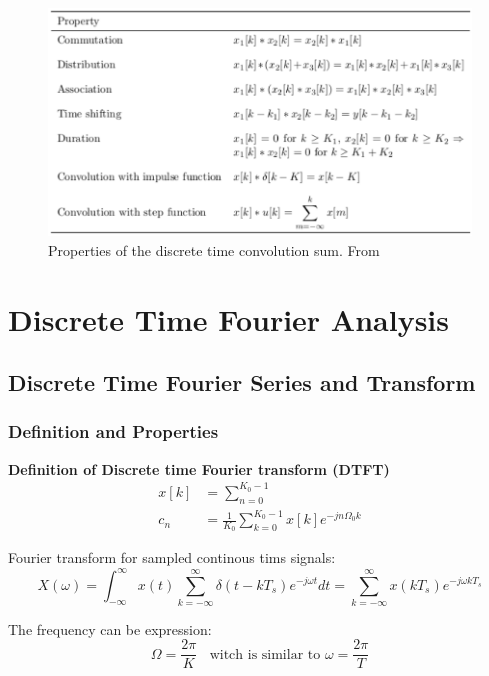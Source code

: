 \begin{figure}[H]
    \centering
    \includegraphics[width=12cm]{image/properties_of_the_discreate_time_convolution_sum.pdf}
    \caption{Properties of the discrete time convolution sum. From \cite{}}
    \label{fig:properties_of_the_discreate_time_convolution_sum}
\end{figure}


\section{Discrete Time Fourier Analysis}
\subsection{Discrete Time Fourier Series and Transform}
\subsubsection{Definition and Properties}
\textbf{Definition of Discrete time Fourier transform (DTFT)}
\begin{align*}
    x[k] &= \sum_{n=0}^{K_0-1} \\
    c_n  &= \frac{1}{K_0}\sum_{k=0}^{K_0-1} x[k]e^{-jn\Omega_0k}
\end{align*}

Fourier transform for sampled continous tims signals:
\begin{equation*}
    X(\omega) 
    = \int_{-\infty}^{\infty}x(t) \sum_{k=-\infty}^{\infty} \delta(t-kT_s)e^{-j\omega t}dt
    = \sum_{k=-\infty}^{\infty} x(kT_s)e^{-j\omega kT_s}
\end{equation*}

The frequency can be expression:
\begin{equation*}
    \Omega = \frac{2\pi}{K} \;\; \text{ witch is similar to } \omega=\frac{2\pi}{T}
\end{equation*}

